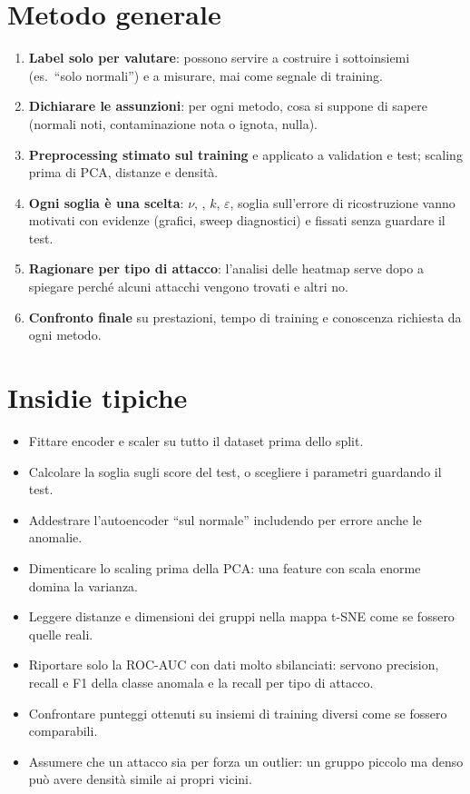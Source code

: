 \section{Metodo generale}
\begin{enumerate}
  \item \textbf{Label solo per valutare}: possono servire a costruire i sottoinsiemi (es.\ ``solo
        normali'') e a misurare, mai come segnale di training.
  \item \textbf{Dichiarare le assunzioni}: per ogni metodo, cosa si suppone di sapere (normali noti,
        contaminazione nota o ignota, nulla).
  \item \textbf{Preprocessing stimato sul training} e applicato a validation e test; scaling prima di
        PCA, distanze e densità.
  \item \textbf{Ogni soglia è una scelta}: $\nu$, , $k$, $\varepsilon$, soglia
        sull'errore di ricostruzione vanno motivati con evidenze (grafici, sweep diagnostici) e fissati
        senza guardare il test.
  \item \textbf{Ragionare per tipo di attacco}: l'analisi delle heatmap serve dopo a spiegare perché
        alcuni attacchi vengono trovati e altri no.
  \item \textbf{Confronto finale} su prestazioni, tempo di training e conoscenza richiesta da ogni metodo.
\end{enumerate}

\section{Insidie tipiche}
\begin{attenzione}
\begin{itemize}
  \item Fittare encoder e scaler su tutto il dataset prima dello split.
  \item Calcolare la soglia sugli score del test, o scegliere i parametri guardando il test.
  \item Addestrare l'autoencoder ``sul normale'' includendo per errore anche le anomalie.
  \item Dimenticare lo scaling prima della PCA: una feature con scala enorme domina la varianza.
  \item Leggere distanze e dimensioni dei gruppi nella mappa t-SNE come se fossero quelle reali.
  \item Riportare solo la ROC-AUC con dati molto sbilanciati: servono precision, recall e F1 della
        classe anomala e la recall per tipo di attacco.
  \item Confrontare punteggi ottenuti su insiemi di training diversi come se fossero comparabili.
  \item Assumere che un attacco sia per forza un outlier: un gruppo piccolo ma denso può avere densità
        simile ai propri vicini.
\end{itemize}
\end{attenzione}

